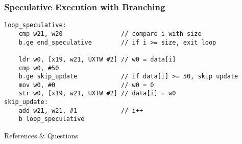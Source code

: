 \documentclass[presentation]{beamer}
\begin{document}
\begin{frame}[fragile]
\frametitle{Speculative Execution with Branching}

\begin{lstlisting}[style=AsmStyle]
loop_speculative:
    cmp w21, w20                // compare i with size
    b.ge end_speculative        // if i >= size, exit loop

    ldr w0, [x19, w21, UXTW #2] // w0 = data[i]
    cmp w0, #50
    b.ge skip_update            // if data[i] >= 50, skip update
    mov w0, #0                  // w0 = 0
    str w0, [x19, w21, UXTW #2] // data[i] = w0
skip_update:
    add w21, w21, #1            // i++
    b loop_speculative
\end{lstlisting}
\end{frame}



% 
% 
% 
% 
% 
% 
% 
% 
% 
% 



\begin{frame}[allowframebreaks]{References \& Questions}
    \printbibliography
\end{frame}
\end{document}
